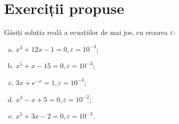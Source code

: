 
\section{Exerciții propuse}

Găsiți soluția reală a ecuațiilor de mai jos, cu eroarea $ \varepsilon $:
\begin{enumerate}[(a)]
\item $ x^3 + 12x - 1 = 0, \varepsilon = 10^{-3} $;
\item $ x^5 + x - 15 = 0, \varepsilon = 10^{-3} $;
\item $ 3x + e^{-x} = 1, \varepsilon = 10^{-3} $;
\item $ x^3 - x + 5 = 0, \varepsilon = 10^{-2} $;
\item $ x^5 + 3x - 2 = 0, \varepsilon = 10^{-3} $.
\end{enumerate}

